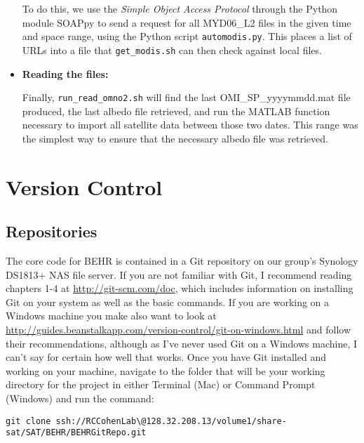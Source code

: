 \documentclass[12pt]{article}
\begin{document}
\begin{itemize}
			To do this, we use the \emph{Simple Object Access Protocol} through the Python module SOAPpy to send a request for all MYD06\_L2 files in the given time and space range, using the Python script \texttt{automodis.py}. This places a list of URLs into a file that \texttt{get\_modis.sh} can then check against local files. 
			
			\item \textbf{Reading the files:}
			
			Finally, \texttt{run\_read\_omno2.sh} will find the last OMI\_SP\_yyyymmdd.mat file produced, the last albedo file retrieved, and run the MATLAB function necessary to import all satellite data between those two dates. This range was the simplest way to ensure that the necessary albedo file was retrieved.
			
		\end{itemize}
		
		
		
\section{Version Control}\label{sec:version-control}
	\subsection{Repositories}
	The core code for BEHR is contained in a Git repository on our group's Synology DS1813+ NAS file server.  If you are not familiar with Git, I recommend reading chapters 1-4 at \url{http://git-scm.com/doc}, which includes information on installing Git on your system as well as the basic commands.  If you are working on a Windows machine you make also want to look at \url{http://guides.beanstalkapp.com/version-control/git-on-windows.html} and follow their recommendations, although as I've never used Git on a Windows machine, I can't say for certain how well that works.  
	Once you have Git installed and working on your machine, navigate to the folder that will be your working directory for the project in either Terminal (Mac) or Command Prompt (Windows) and run the command:

\vspace{12pt}
\lstset{basicstyle=\scriptsize\ttfamily}
\begin{lstlisting}
git clone ssh://RCCohenLab\@128.32.208.13/volume1/share-sat/SAT/BEHR/BEHRGitRepo.git
\end{lstlisting}
\lstset{basicstyle=\ttfamily}
\end{document}
